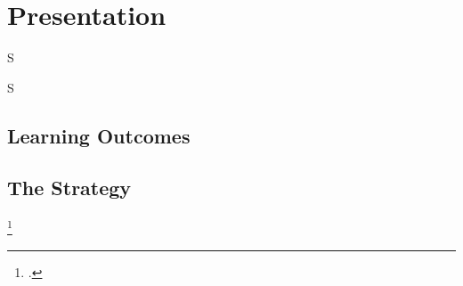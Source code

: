 \frenchspacing
\chapter{Presentation}
\epigraph{S}{S}

%
\section{Learning Outcomes}

%
\section{The Strategy}
\footcite{cohan2003greatdemo}

%
\printbibliography[heading=secbibliography, title={References}]